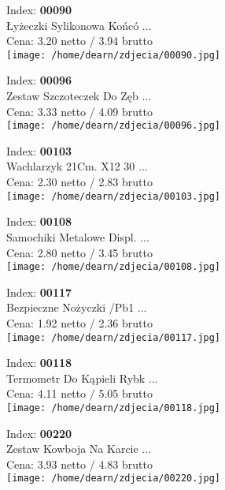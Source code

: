 {Index: \textbf{00090}\\
Łyżeczki Sylikonowa Końcó ...\\
Cena: 3.20 netto / 3.94 brutto\\
  \texttt{[image: /home/dearn/zdjecia/00090.jpg]}}\newline\newline

{Index: \textbf{00096}\\
Zestaw Szczoteczek Do Zęb ...\\
Cena: 3.33 netto / 4.09 brutto\\
  \texttt{[image: /home/dearn/zdjecia/00096.jpg]}}\newline\newline

{Index: \textbf{00103}\\
Wachlarzyk 21Cm.  X12  30 ...\\
Cena: 2.30 netto / 2.83 brutto\\
  \texttt{[image: /home/dearn/zdjecia/00103.jpg]}}\newline\newline

{Index: \textbf{00108}\\
Samochiki Metalowe Displ. ...\\
Cena: 2.80 netto / 3.45 brutto\\
  \texttt{[image: /home/dearn/zdjecia/00108.jpg]}}\newline\newline

{Index: \textbf{00117}\\
Bezpieczne Nożyczki  /Pb1 ...\\
Cena: 1.92 netto / 2.36 brutto\\
  \texttt{[image: /home/dearn/zdjecia/00117.jpg]}}\newline\newline

{Index: \textbf{00118}\\
Termometr Do Kąpieli Rybk ...\\
Cena: 4.11 netto / 5.05 brutto\\
  \texttt{[image: /home/dearn/zdjecia/00118.jpg]}}\newline\newline

{Index: \textbf{00220}\\
Zestaw Kowboja Na Karcie  ...\\
Cena: 3.93 netto / 4.83 brutto\\
  \texttt{[image: /home/dearn/zdjecia/00220.jpg]}}\newline\newline

